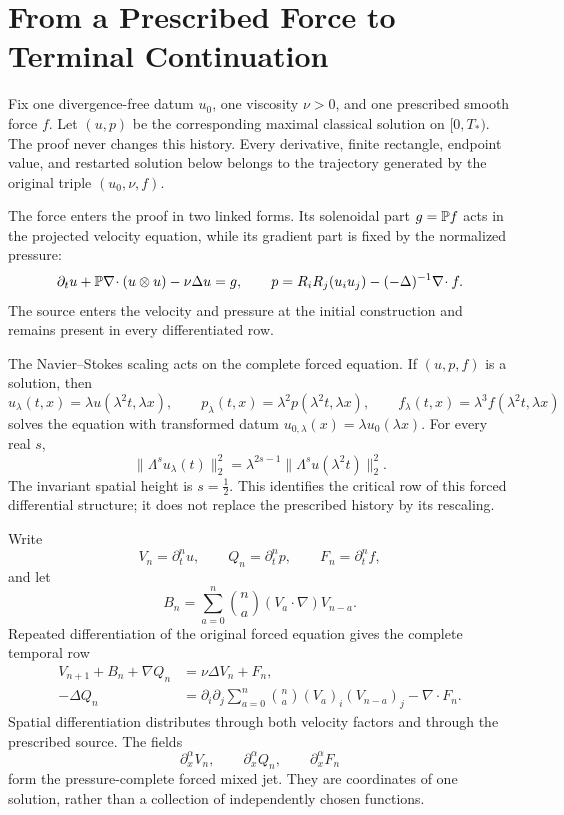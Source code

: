 \section{From a Prescribed Force to Terminal Continuation}
\label{f:sec:forced-argument-overview}
\label{f:guide:how-proof-works}

Fix one divergence-free datum \(u_0\), one viscosity \(\nu>0\), and one
prescribed smooth force \(f\).  Let \((u,p)\) be the corresponding maximal
classical solution on \([0,T_*)\).  The proof never changes this history.
Every derivative, finite rectangle, endpoint value, and restarted solution
below belongs to the trajectory generated by the original triple
\((u_0,\nu,f)\).

The force enters the proof in two linked forms.  Its solenoidal part
\(g=\mathbb P f\) acts in the projected velocity equation, while its gradient part
is fixed by the normalized pressure:
\[
 \partial_tu+\mathbb P\nabla\!\cdot(u\otimes u)-\nu\Delta u=g,
 \qquad
 p=R_iR_j(u_i u_j)-(-\Delta)^{-1}\nabla\!\cdot f.
\]
The source enters the velocity and pressure at the initial
construction and remains present in every differentiated row.

The Navier--Stokes scaling acts on the complete forced equation.  If
\((u,p,f)\) is a solution, then
\[
 u_\lambda(t,x)=\lambda u(\lambda^2t,\lambda x),\qquad
 p_\lambda(t,x)=\lambda^2p(\lambda^2t,\lambda x),\qquad
 f_\lambda(t,x)=\lambda^3f(\lambda^2t,\lambda x)
\]
solves the equation with transformed datum
\(u_{0,\lambda}(x)=\lambda u_0(\lambda x)\).  For every real \(s\),
\[
 \|\Lambda^su_\lambda(t)\|_2^2
 =\lambda^{2s-1}\|\Lambda^su(\lambda^2t)\|_2^2.
\]
The invariant spatial height is \(s=\tfrac12\).  This identifies
the critical row of this forced differential structure; it does not
replace the prescribed history by its rescaling.

Write
\[
 V_n=\partial_t^nu,\qquad Q_n=\partial_t^np,
 \qquad F_n=\partial_t^nf,
\]
and let
\[
 B_n=\sum_{a=0}^n\binom na(V_a\cdot\nabla)V_{n-a}.
\]
Repeated differentiation of the original forced equation gives the complete
temporal row
\begin{align}
 V_{n+1}+B_n+\nabla Q_n&=\nu\Delta V_n+F_n,
 \label{f:eq:guide-forced-row}\\
 -\Delta Q_n
 &=\partial_i\partial_j\sum_{a=0}^n\binom na
      (V_a)_i(V_{n-a})_j-\nabla\!\cdot F_n.
 \label{f:eq:guide-forced-pressure}
\end{align}
Spatial differentiation distributes through both velocity factors and through
the prescribed source.  The fields
\[
 \partial_x^\alpha V_n,\qquad
 \partial_x^\alpha Q_n,\qquad
 \partial_x^\alpha F_n
\]
form the pressure-complete forced mixed jet.  They are coordinates of one
solution, rather than a collection of independently chosen functions.

